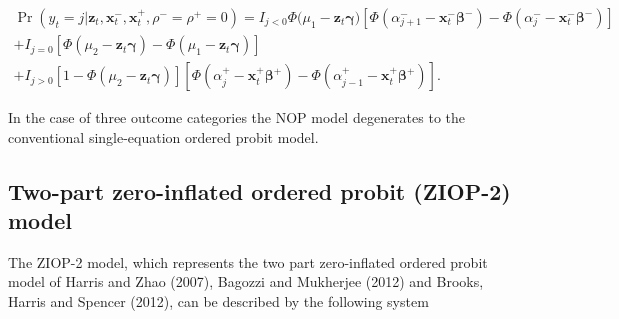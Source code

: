 \documentclass[letterpaper,fleqn,12pt]{article}
\begin{document}
\begin{onehalfspace}
\begin{center}
$%
\begin{array}{l}
\Pr (y_{t}=j|\mathbf{z}_{t},\mathbf{x}_{t}^{-},\mathbf{x}_{t}^{+},\rho
^{-}=\rho ^{+}=0)=I_{j<0}\Phi (\mu _{1}-\mathbf{z}_{t}\mathbf{\gamma )}[\Phi
(\alpha _{j+1}^{-}-\mathbf{x}_{t}^{-}\mathbf{\beta }^{-})-\Phi (\alpha
_{j}^{-}-\mathbf{x}_{t}^{-}\mathbf{\beta }^{-})] \\ 
+I_{j=0}[\Phi (\mu _{2}-\mathbf{z}_{t}\mathbf{\gamma })-\Phi (\mu _{1}-%
\mathbf{z}_{t}\mathbf{\gamma })] \\ 
+I_{j>0}[1-\Phi (\mu _{2}-\mathbf{z}_{t}\mathbf{\gamma })][\Phi (\alpha
_{j}^{+}-\mathbf{x}_{t}^{+}\mathbf{\beta }^{+})-\Phi (\alpha _{j-1}^{+}-%
\mathbf{x}_{t}^{+}\mathbf{\beta }^{+})]\text{.}%
\end{array}%
$
\end{center}

In the case of three outcome categories the NOP model degenerates to the
conventional single-equation ordered probit model.

\subsection{Two-part zero-inflated ordered probit (ZIOP-2) model}

The ZIOP-2 model, which represents the two part zero-inflated ordered probit
model of Harris and Zhao (2007), Bagozzi and Mukherjee (2012) and Brooks,
Harris and Spencer (2012), can be described by the following system

\medskip


\end{onehalfspace}
\end{document}
